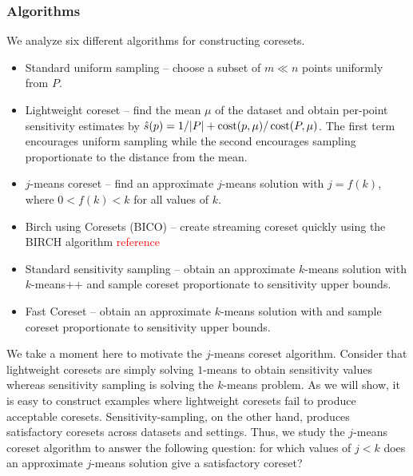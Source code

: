 

\subsubsection{Algorithms}

We analyze six different algorithms for constructing coresets.
\begin{itemize}
        \item Standard uniform sampling -- choose a subset of $m \ll n$ points uniformly from $P$.
        \item Lightweight coreset -- find the mean $\mu$ of the dataset and obtain per-point sensitivity estimates by $\hat{s}(p) = 1/|P| + \operatorname{cost}(p, \mu) / \operatorname{cost}(P, \mu)$.
            The first term encourages uniform sampling while the second encourages sampling proportionate to the distance from the mean.
        \item $j$-means coreset -- find an approximate $j$-means solution with $j = f(k)$, where $0 < f(k) < k$ for all values of $k$.
        \item Birch using Coresets (BICO) -- create streaming coreset quickly using the BIRCH algorithm \textcolor{red}{reference}
        \item Standard sensitivity sampling -- obtain an approximate $k$-means solution with $k$-means++ and sample coreset proportionate to sensitivity upper bounds.
        \item Fast Coreset -- obtain an approximate $k$-means solution with \fkmeans and sample coreset proportionate to sensitivity upper bounds.

\end{itemize}

We take a moment here to motivate the $j$-means coreset algorithm.  Consider that lightweight coresets are simply solving $1$-means to obtain sensitivity values
whereas sensitivity sampling is solving the $k$-means problem.  As we will show, it is easy to construct examples where lightweight coresets fail to produce
acceptable coresets. Sensitivity-sampling, on the other hand, produces satisfactory coresets across datasets and settings. Thus, we study the $j$-means coreset
algorithm to answer the following question: for which values of $j < k$ does an approximate $j$-means solution give a satisfactory coreset?

